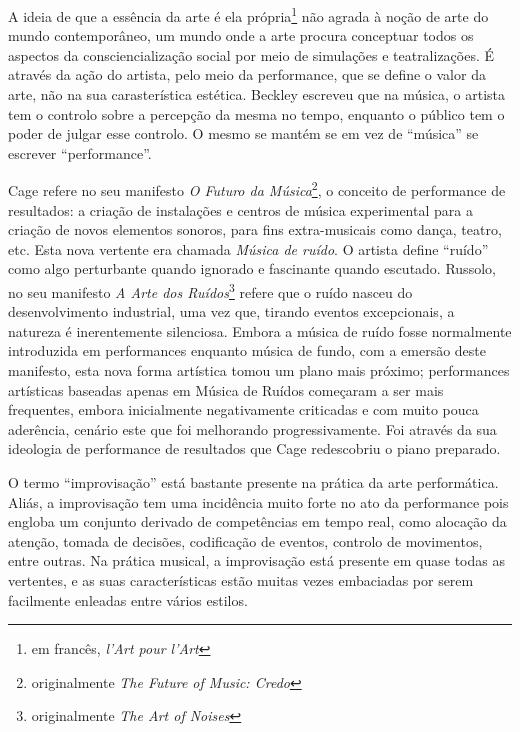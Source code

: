 \documentclass[../main.tex]{subfiles}
\begin{document}
A ideia de que a essência da arte é ela própria\footnote{em francês, \textsl{l'Art pour l'Art}} não agrada à noção de arte do mundo contemporâneo\cite{battcock}, um mundo onde a arte procura conceptuar todos os aspectos da consciencialização social por meio de simulações e teatralizações\cite{carlson1996}. É através da ação do artista, pelo meio da performance, que se define o valor da arte, não na sua carasterística estética\cite{nickas}. Beckley escreveu que na música, o artista tem o controlo sobre a percepção da mesma no tempo, enquanto o público tem o poder de julgar esse controlo\cite{beckley}. O mesmo se mantém se em vez de \enquote{música} se escrever \enquote{performance}\cite{nickas}.

Cage refere no seu manifesto \textsl{O Futuro da Música}\footnote{originalmente \textsl{The Future of Music: Credo}}, o conceito de performance de resultados: a criação de instalações e centros de música experimental para a criação de novos elementos sonoros, para fins extra-musicais como dança, teatro, etc\cite{cage1961}. Esta nova vertente era chamada \textsl{Música de ruído}. O artista define \enquote{ruído} como algo perturbante quando ignorado e fascinante quando escutado. Russolo, no seu manifesto \textsl{A Arte dos Ruídos}\footnote{originalmente \textsl{The Art of Noises}} refere que o ruído nasceu do desenvolvimento industrial, uma vez que, tirando eventos excepcionais, a natureza é inerentemente silenciosa\cite{russolo}. Embora a música de ruído fosse normalmente introduzida em performances enquanto música de fundo, com a emersão deste manifesto, esta nova forma artística tomou um plano mais próximo\cite{goldberg}; performances artísticas baseadas apenas em Música de Ruídos começaram a ser mais frequentes, embora inicialmente negativamente criticadas e com muito pouca aderência, cenário este que foi melhorando progressivamente\cite{russolo,goldberg}. Foi através da sua ideologia de performance de resultados que Cage redescobriu o piano preparado.

O termo \enquote{improvisação} está bastante presente na prática da arte performática\cite{howell1999,goldberg}. Aliás, a improvisação tem uma incidência muito forte no ato da performance pois engloba um conjunto derivado de competências em tempo real, como alocação da atenção, tomada de decisões, codificação de eventos, controlo de movimentos, entre outras\cite{gabrielsson}. Na prática musical, a improvisação está presente em quase todas as vertentes, e as suas características estão muitas vezes embaciadas por serem facilmente enleadas entre vários estilos\cite{derek}. 
\end{document}
